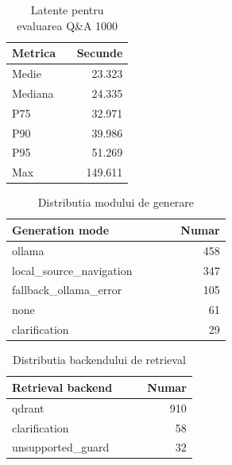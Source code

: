 \begin{table}[htbp]
\centering
\caption{Latente pentru evaluarea Q\&A 1000}
\label{tab:qa1000-latente}
\begin{tabular}{p{0.45\linewidth}r}
\hline
Metrica & Secunde \\
\hline
Medie & 23.323 \\
Mediana & 24.335 \\
P75 & 32.971 \\
P90 & 39.986 \\
P95 & 51.269 \\
Max & 149.611 \\
\hline
\end{tabular}
\end{table}

\begin{table}[htbp]
\centering
\caption{Distributia modului de generare}
\label{tab:qa1000-generation-mode}
\begin{tabular}{p{0.60\linewidth}r}
\hline
Generation mode & Numar \\
\hline
ollama & 458 \\
local\_source\_navigation & 347 \\
fallback\_ollama\_error & 105 \\
none & 61 \\
clarification & 29 \\
\hline
\end{tabular}
\end{table}

\begin{table}[htbp]
\centering
\caption{Distributia backendului de retrieval}
\label{tab:qa1000-retrieval-backend}
\begin{tabular}{p{0.60\linewidth}r}
\hline
Retrieval backend & Numar \\
\hline
qdrant & 910 \\
clarification & 58 \\
unsupported\_guard & 32 \\
\hline
\end{tabular}
\end{table}

